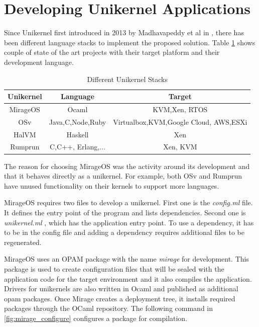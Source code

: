 
\section{Developing Unikernel Applications}

Since Unikernel first introduced in 2013 by Madhavapeddy et al in \cite{library-operating-system}, there has been different language stacks to implement the proposed solution. Table \ref{tab:stacks} shows couple of state of the art projects with their target platform and their development language.

\begin{table}[htpb]
    \caption[Different Unikernel Stacks]{Different Unikernel Stacks}\label{tab:stacks}
    \centering
    \begin{tabular}{ |c |c |c| }
      \toprule
        Unikernel & Language & Target \\
      \midrule
        MirageOS & Ocaml & KVM,Xen, RTOS \\
        \hline
        OSv & Java,C,Node,Ruby & Virtualbox,KVM,Google Cloud, AWS,ESXi \\
        \hline
        HalVM & Haskell & Xen \\
      \hline
        Rumprun & C,C++, Erlang,... &  Xen, KVM \\
      \bottomrule
    \end{tabular}
  \end{table}

The reason for choosing MirageOS was the activity around its development and that it behaves directly as a unikernel. For example, both OSv and Rumprun have unused functionality on their kernels to support more languages.

MirageOS requires two files to develop a unikernel. First one is the \textit{config.ml} file. It defines the entry point of the program and lists dependencies. Second one is \textit{unikernel.ml} , which has the application entry point. To use a dependency, it has to be in the config file and adding a dependency requires additional files to be regenerated.

MirageOS uses an OPAM package with the name \textit{mirage} \cite{opammirage} for development. This package is used to create configuration files that will be sealed with the application code for the target environment and it also compiles the application. Drivers for unikernels are also written in Ocaml and published as additional opam packages. Once Mirage creates a deployment tree, it installs required packages through the OCaml repository. The following command in \ref{fig:mirage_configure} configures a package for compilation. 

